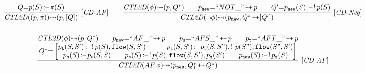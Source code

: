 
\begin{figure*}[!h]
\centering
\begin{gather*}
\frac{
\begin{matrix}
\drule {=} \nm(S) \datalogarrow \pi(S)
\end{matrix}
}{\CTLToD{(\nm,\pi)}{\nm}{[\drule]}
}~[\CTLtoDKey\m{AP}]
\qquad 
\frac{
\begin{matrix}
\CTLToD{\phi}{\nm}{\drule^*} 
\qquad 
\nm_{\mathtt{new}} {=} ``NOT\_" \concat \nm  \qquad 
\drule^\prime {=} \nm_{\mathtt{new}}(S) \datalogarrow\shortNeg\,\nm(S)
\end{matrix}
}{ 
\CTLToD{\neg\phi}{\nm_{\mathtt{new}}}{\drule^* \concat [\drule^\prime]}
}~ 
[\CTLtoDKey\m{Neg}]
\\[1.5em]
\frac{
\begin{matrix}
\CTLToD{\phi}{\nm}{\drule^*_1} \qquad
\nm_{\mathtt{new}} {=} ``AF\_" \concat \nm \qquad
\nm_{\mathtt{s}} {=} ``AFS\_" \concat \nm \qquad
\nm_{\mathtt{t}} {=} ``AFT\_" \concat \nm
\\
\drule^* {=} 
\left[\begin{matrix} 
\nm_{\mathtt{t}}(S,S') {\datalogarrow} \shortNeg\, \nm(S), \predFlow(S,S') 
\qquad\quad 
\nm_{\mathtt{t}}(S,S') {\datalogarrow}\nm_{\mathtt{t}}(S,S"), \shortNeg\ \nm(S"), \predFlow(S",S') 
\\
\nm_{\mathtt{s}}(S) \datalogarrow\nm_{t}(S,S)
\qquad\nm_{\mathtt{s}}(S) \datalogarrow\shortNeg \,\nm(S) , \predFlow(S,S'), \nm_{\mathtt{s}}(S') 
\qquad\nm_{\mathtt{new}}(S) \datalogarrow\shortNeg \,\nm_{\mathtt{s}}(S)
\end{matrix} \right]
\end{matrix}
}{\CTLToD{AF\,\phi}{\nm_{\mathtt{new}}}{\drule^*_1 \concat \drule^*}
}~[\CTLtoDKey\m{AF}]
\hide{
\\[0.2em] 
\frac{
\begin{matrix}
[\CTLtoDKey\m{EF}] \\
\CTLToD{\phi}{\nm}{\drule^*_1} \quad\nm_{\mathtt{new}} {=} "EF\_" {\concat} \nm\\
\drule^* {=} \left[
\begin{matrix}
\nm_{\mathtt{new}}(S) \datalogarrow\ \nm(S) \\

\end{matrix}
\end{matrix}}}
\end{gather*}
\end{figure*}
